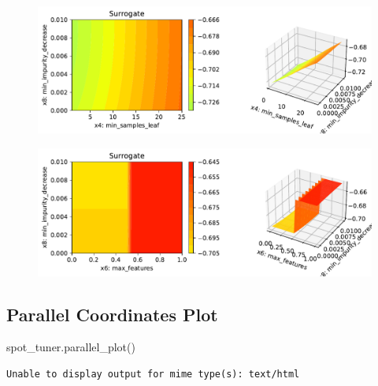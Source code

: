 \documentclass[
  letterpaper,
  DIV=11,
  numbers=noendperiod]{scrreprt}
\newenvironment{Shaded}{\begin{snugshade}}{\end{snugshade}}
\newcommand{\NormalTok}[1]{\textcolor[rgb]{0.00,0.23,0.31}{#1}}
\begin{document}
\begin{figure}[H]

{\centering \includegraphics{16_spot_hpt_sklearn_multiclass_classification_randomforest_files/figure-pdf/cell-48-output-15.pdf}

}

\end{figure}

\begin{figure}[H]

{\centering \includegraphics{16_spot_hpt_sklearn_multiclass_classification_randomforest_files/figure-pdf/cell-48-output-16.pdf}

}

\end{figure}

\hypertarget{parallel-coordinates-plot-1}{%
\subsection{Parallel Coordinates
Plot}\label{parallel-coordinates-plot-1}}

\begin{Shaded}
\begin{Highlighting}[]
\NormalTok{spot\_tuner.parallel\_plot()}
\end{Highlighting}
\end{Shaded}

\begin{verbatim}
Unable to display output for mime type(s): text/html
\end{verbatim}
\end{document}
